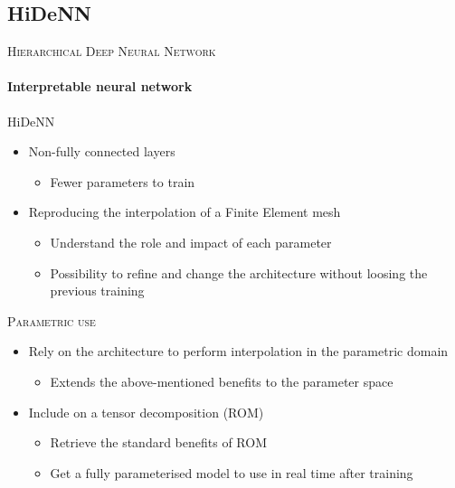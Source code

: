 \documentclass[aspectratio=1610, 10pt]{beamer}
\begin{document}
\subsection{HiDeNN}
    \begin{frame}{\textsc{Hierarchical Deep Neural Network}}
    \framesubtitle{Interpretable neural network}
        \begin{blueblockshadow}{HiDeNN}
        \begin{itemize}
            \item Non-fully connected layers
            \begin{itemize}
                \item Fewer parameters to train
            \end{itemize}
            \item Reproducing the interpolation of a Finite Element mesh
            \begin{itemize}
                \item Understand the role and impact of each parameter
                \item Possibility to refine and change the architecture without loosing the previous training
            \end{itemize}
        \end{itemize}
        \end{blueblockshadow}
        \vfill
        \begin{greenblockshadow}{\textsc{Parametric use}}
            \begin{itemize}
                \item Rely on the architecture to perform interpolation in the parametric domain
                \begin{itemize}
                    \item Extends the above-mentioned benefits to the parameter space
                \end{itemize}
                \item Include on a tensor decomposition (ROM)
                \begin{itemize}
                    \item Retrieve the standard benefits of ROM
                    \item Get a fully parameterised model to use in real time after training
                \end{itemize}
            \end{itemize}
        \end{greenblockshadow}
    \end{frame}
\end{document}
